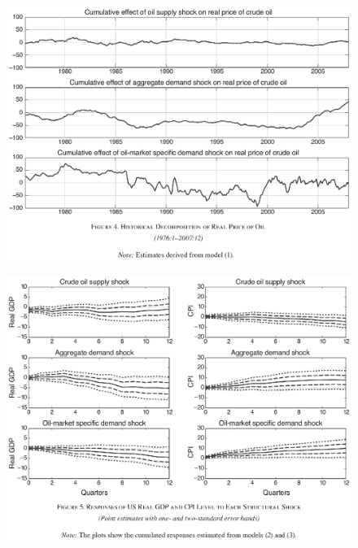 \documentclass{beamer}
\begin{document}
\begin{frame}
  \begin{figure}
    \includegraphics[scale=.7]{killian4.eps}
  \end{figure}
\end{frame}

\begin{frame}
  \begin{figure}
    \includegraphics[scale=.7]{killian5.eps}
  \end{figure}
\end{frame}
\end{document}
